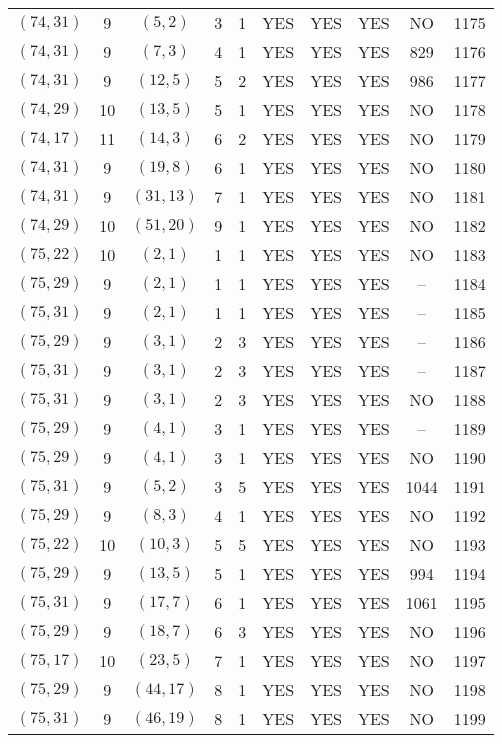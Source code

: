 \begin{longtable}{|c|c|c|c|c|c|c|c|c|c|}
$(74, 31)$ & 9 & $(5, 2)$ & 3 & 1 & YES & YES & YES & NO & 1175\\
$(74, 31)$ & 9 & $(7, 3)$ & 4 & 1 & YES & YES & YES & 829 & 1176\\
$(74, 31)$ & 9 & $(12, 5)$ & 5 & 2 & YES & YES & YES & 986 & 1177\\
$(74, 29)$ & 10 & $(13, 5)$ & 5 & 1 & YES & YES & YES & NO & 1178\\
$(74, 17)$ & 11 & $(14, 3)$ & 6 & 2 & YES & YES & YES & NO & 1179\\
$(74, 31)$ & 9 & $(19, 8)$ & 6 & 1 & YES & YES & YES & NO & 1180\\
$(74, 31)$ & 9 & $(31, 13)$ & 7 & 1 & YES & YES & YES & NO & 1181\\
$(74, 29)$ & 10 & $(51, 20)$ & 9 & 1 & YES & YES & YES & NO & 1182\\
$(75, 22)$ & 10 & $(2, 1)$ & 1 & 1 & YES & YES & YES & NO & 1183\\
$(75, 29)$ & 9 & $(2, 1)$ & 1 & 1 & YES & YES & YES & -- & 1184\\
$(75, 31)$ & 9 & $(2, 1)$ & 1 & 1 & YES & YES & YES & -- & 1185\\
$(75, 29)$ & 9 & $(3, 1)$ & 2 & 3 & YES & YES & YES & -- & 1186\\
$(75, 31)$ & 9 & $(3, 1)$ & 2 & 3 & YES & YES & YES & -- & 1187\\
$(75, 31)$ & 9 & $(3, 1)$ & 2 & 3 & YES & YES & YES & NO & 1188\\
$(75, 29)$ & 9 & $(4, 1)$ & 3 & 1 & YES & YES & YES & -- & 1189\\
$(75, 29)$ & 9 & $(4, 1)$ & 3 & 1 & YES & YES & YES & NO & 1190\\
$(75, 31)$ & 9 & $(5, 2)$ & 3 & 5 & YES & YES & YES & 1044 & 1191\\
$(75, 29)$ & 9 & $(8, 3)$ & 4 & 1 & YES & YES & YES & NO & 1192\\
$(75, 22)$ & 10 & $(10, 3)$ & 5 & 5 & YES & YES & YES & NO & 1193\\
$(75, 29)$ & 9 & $(13, 5)$ & 5 & 1 & YES & YES & YES & 994 & 1194\\
$(75, 31)$ & 9 & $(17, 7)$ & 6 & 1 & YES & YES & YES & 1061 & 1195\\
$(75, 29)$ & 9 & $(18, 7)$ & 6 & 3 & YES & YES & YES & NO & 1196\\
$(75, 17)$ & 10 & $(23, 5)$ & 7 & 1 & YES & YES & YES & NO & 1197\\
$(75, 29)$ & 9 & $(44, 17)$ & 8 & 1 & YES & YES & YES & NO & 1198\\
$(75, 31)$ & 9 & $(46, 19)$ & 8 & 1 & YES & YES & YES & NO & 1199\\

\end{longtable}
